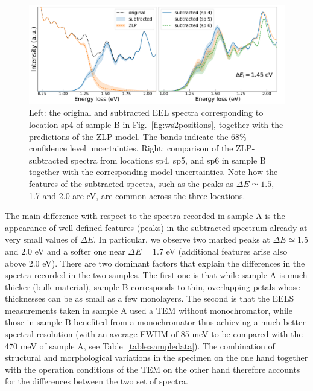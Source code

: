 \begin{figure}[t]
\begin{centering}
  \includegraphics[width=0.99\linewidth]{plots/subtractedEELS_plot_sampleB_sp4.pdf}
  \caption{Left: the original
     and subtracted EEL spectra corresponding to location sp4 of sample B in Fig.~\ref{fig:ws2positions},
     together with the predictions of the ZLP model.
     The bands indicate the 68\% confidence level uncertainties.
     Right: comparison of the ZLP-subtracted spectra from locations sp4, sp5, and sp6 in sample B
     together with the corresponding model uncertainties.
     Note how the features of the subtracted spectra, such as the peaks as $\Delta E\simeq 1.5$,
    1.7 and 2.0 are eV, are common across the three locations.
  }
\label{fig:SubtractedEELS_plot_sp4}
\end{centering}
\end{figure}

The main difference with respect to the spectra recorded in sample A is the appearance
of well-defined features (peaks) in the subtracted spectrum already at very small values of $\Delta E$.
%
In particular, we observe two marked peaks at $\Delta E\simeq 1.5$ and 2.0 eV and a
softer one near $\Delta E=1.7$ eV (additional features arise also above 2.0 eV).
%
There are two dominant factors that explain the differences in the  spectra recorded
in the two samples.
%
The first one is that while sample A is much thicker (bulk material), sample B corresponds
to thin, overlapping petals whose thicknesses can be as small as a few monolayers.
%
The second is that the EELS measurements taken in sample A used a TEM without monochromator,
while those in sample B benefited from a monochromator thus achieving a much better
spectral resolution (with an average FWHM of 85 meV to be compared with the 470 meV of sample A, see
Table~\ref{table:sampledata}).
%
The combination of structural and morphological variations in the specimen on the one hand together
with the operation conditions of the TEM on the other hand therefore accounts for the differences
between the two set of spectra.

